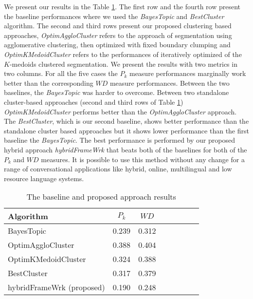 \documentclass{article}
\begin{document}
We present our results in the Table \ref{tab:res}. The first row and the fourth row present the baseline performances where we used the \emph{BayesTopic} and \emph{BestCluster} algorithm. The second and third rows present our proposed clustering based approaches, \emph{OptimAggloCluster} refers to the approach of segmentation using agglomerative clustering, then optimized with fixed boundary clumping and \emph{OptimKMedoidCluster} refers to the performances of iteratively optimized of the $K$-medoids clustered segmentation. We present the results with two metrics in two columns. %
For all the five cases the $P_k$ measure performances marginally work better than the corresponding $WD$ measure performances. Between the two baselines, the \emph{BayesTopic} was harder to overcome. Between two standalone cluster-based approaches (second and third rows of Table \ref{tab:res}) \emph{OptimKMedoidCluster} performs better than the \emph{OptimAggloCluster} approach. The \emph{BestCluster}, which is our second baseline, shows better performance than the standalone cluster based approaches but it shows lower performance than the first baseline the \emph{BayesTopic}. The best performance is performed by our proposed hybrid approach \emph{hybridFrameWrk} that beats both of the baselines for both of the $P_k$ and $WD$ measures. 
It is possible to use this method without any change for a range of conversational applications like hybrid, online, multilingual and low resource language systems.

\begin{table}
\begin{center}
\small{
\begin{tabular}{l*{6}{c}r}
\hline \hline
Algorithm  & $P_k$ & $WD$  \\
\hline \hline
BayesTopic \cite{eisenstein-08} & 0.239 & 0.312 \\
\hline
OptimAggloCluster  & 0.388 & 0.404  \\
OptimKMedoidCluster  & 0.324 & 0.388 \\
BestCluster & 0.317 & 0.379 \\
\hline
hybridFrameWrk (proposed) & 0.190 & 0.248 \\
\hline
\end{tabular}
}
\end{center}
\vspace*{-\baselineskip}
\caption{The baseline and proposed approach results}\label{tab:res}
\end{table}
\end{document}
